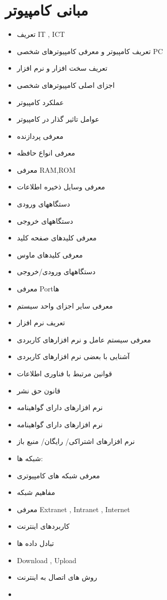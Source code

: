 \chapter{مبانی کامپیوتر}

\begin{itemize}
\item
تعریف IT , ICT
\item
تعریف کامپیوتر و معرفی کامپیوترهای شخصی PC
\item
تعریف سخت افزار و نرم افزار
\item
اجزای اصلی کامپیوترهای شخصی
\item
عملکرد کامپیوتر
\item
عوامل تاثیر گذار در کامپیوتر
\item
معرفی پردازنده
\item
معرفی انواع حافظه
\item
معرفی RAM,ROM
\item
معرفی وسایل ذخیره اطلاعات
\item
دستگاههای ورودی
\item
دستگاههای خروجی
\item
معرفی کلیدهای صفحه کلید
\item
معرفی کلیدهای ماوس
\item
دستگاههای ورودی/خروجی
\item
معرفی Portها
\item
معرفی سایر اجزای واحد سیستم
\item
تعریف نرم افزار
\item
معرفی سیستم عامل و نرم افزارهای کاربردی
\item
آشنایی با بعضی نرم افزارهای کاربردی
\item
قوانین مرتبط با فناوری اطلاعات
\item
قانون حق نشر
\item
نرم افزارهای دارای گواهینامه
\item
نرم افزارهای دارای گواهینامه
\item
نرم افزارهای اشتراکی/ رایگان/ منبع باز
\item
شبکه ها:
\item
معرفی شبکه های کامپیوتری
\item
مفاهیم شبکه
\item
معرفی Extranet , Intranet , Internet
\item
کاربردهای اینترنت
\item
تبادل داده ها
\item
Download , Upload
\item
روش های اتصال به اینترنت
\item

\end{itemize}

